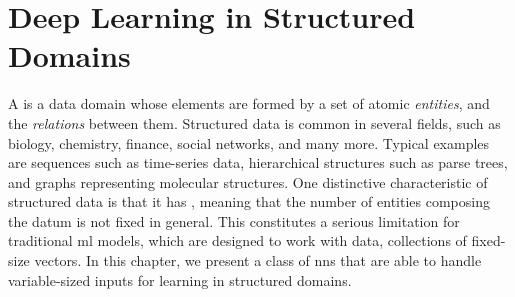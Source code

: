 \chapter{Deep Learning in Structured Domains} \label{ch:deep-learning-structures}
A  is a data domain whose elements are formed by a set of atomic \emph{entities}, and the \emph{relations} between them. Structured data is common in several fields, such as biology, chemistry, finance, social networks, and many more. Typical examples are sequences such as time-series data, hierarchical structures such as parse trees, and graphs representing molecular structures. One distinctive characteristic of structured data is that it has , meaning that the number of entities composing the datum is not fixed in general. This constitutes a serious limitation for traditional \gls{ml} models, which are designed to work with  data, \ie collections of fixed-size vectors. In this chapter, we present a class of \glspl{nn} that are able to handle variable-sized inputs for learning in structured domains.

